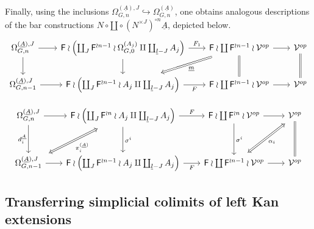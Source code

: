 \documentclass[a4paper,10pt]{article}%
\begin{document}
Finally, using the inclusions $\Omega_{G,n}^{(\underline{A}),J} \hookrightarrow \Omega_{G,n}^{(\underline{A})}$,
one obtains analogous descriptions of the bar constructions 
$N \circ \amalg \circ (N^{\times J})^{\circ n} \underline{A}$, 
depicted below.
\begin{equation}
	\begin{tikzcd}[column sep=2em]
	\Omega_{G,n}^{(\underline{A}),J} \ar{d} \ar{r} &
	\Fin \wr \left( \coprod_J \Fin^{\wr n-1} \wr \Omega_{G,0}^{(A_j)} 
	\amalg \coprod_{\underline{l}-J} A_j \right)
	\ar{r}{F_1} \ar{d}&
	|[alias=dog2]|
	\Fin \wr \coprod \Fin^{\wr n-1} \wr \mathcal{V}^{op} \ar{r}  \ar[equal]{d} &
	\mathcal{V}^{op} \ar[equal]{d}
\\
	\Omega_{G,n-1}^{(\underline{A}),J} \ar{r} &
	|[alias=cat3]|
	\Fin \wr \left( \coprod_J \Fin^{\wr n-1} \wr A_j
	\amalg \coprod_{\underline{l}-J} A_j \right)
	\ar{r}[swap]{F} &
	\Fin \wr \coprod \Fin^{\wr n-1} \wr \mathcal{V}^{op} \ar{r} &
	\mathcal{V}^{op}
	\arrow[Rightarrow, from=dog2, to=cat3,shorten <=0.15cm,,shorten >=0.15cm,"\underline{m}"]
	\end{tikzcd}
\end{equation}

\begin{equation}\label{DISJBARDNJ EQ}
	\begin{tikzcd}[column sep=2em,row sep=3em]
	\Omega_{G,n}^{(\underline{A}),J} 
	\ar{d}[swap]{d_i^{\underline{A}}} \ar{r} &
	|[alias=dog2]|
	\Fin \wr \left( \coprod_J \Fin^{\wr n} \wr A_j 
	\amalg \coprod_{\underline{l}-J} A_j \right)
	\ar{r}{F} \ar{d}{\sigma^i}&
	\Fin \wr \coprod \Fin^{\wr n} \wr \mathcal{V}^{op} \ar{r}  \ar{d}{\sigma^i} &
	|[alias=dog3]|
	\mathcal{V}^{op} \ar[equal]{d}
\\
	|[alias=cat3]|
	\Omega_{G,n-1}^{(\underline{A}),J} \ar{r} &
	\Fin \wr \left( \coprod_J \Fin^{\wr n-1} \wr A_j
	\amalg \coprod_{\underline{l}-J} A_j \right) \ar{r}[swap]{F} &
	|[alias=cat2]|
	\Fin \wr \coprod \Fin^{\wr n-1} \wr \mathcal{V}^{op} \ar{r} &
	\mathcal{V}^{op}
	\arrow[Leftrightarrow, from=dog2, to=cat3,shorten <=0.15cm,,shorten >=0.15cm,"\pi_i^{(\underline{A})}"]
	\arrow[Leftrightarrow, from=dog3, to=cat2,shorten <=0.15cm,,shorten >=0.15cm,"\alpha_i"]
	\end{tikzcd}
\end{equation}


\subsection{Transferring simplicial colimits of left Kan extensions} \label{TRANSFSIMP SEC}
\end{document}
